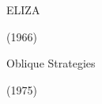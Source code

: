 \documentclass{beamer}
\begin{document}

\begin{frame}[c]
	\centering
	\Huge
	ELIZA
	
	(1966)
\end{frame}

\begin{frame}[plain]
\end{frame}


\begin{frame}[c]
	\centering
	\Huge
	Oblique Strategies
	
	(1975)
\end{frame}


\begin{frame}[plain]
\end{frame}
\end{document}
